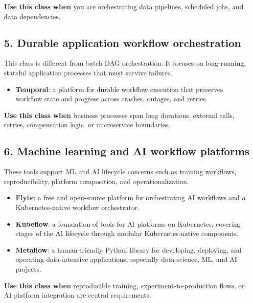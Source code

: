 \documentclass[11pt]{article}
\begin{document}
\textbf{Use this class when} you are orchestrating data pipelines, scheduled jobs, and data dependencies.

\subsection{5. Durable application workflow orchestration}
This class is different from batch DAG orchestration. It focuses on long-running, stateful application processes that must survive failures.
\begin{itemize}
    \item \textbf{Temporal}: a platform for durable workflow execution that preserves workflow state and progress across crashes, outages, and retries.\cite{TemporalWhatIs,TemporalWorkflowExecution}
\end{itemize}

\textbf{Use this class when} business processes span long durations, external calls, retries, compensation logic, or microservice boundaries.

\subsection{6. Machine learning and AI workflow platforms}
These tools support ML and AI lifecycle concerns such as training workflows, reproducibility, platform composition, and operationalization.
\begin{itemize}
    \item \textbf{Flyte}: a free and open-source platform for orchestrating AI workflows and a Kubernetes-native workflow orchestrator.\cite{FlyteOSS}
    \item \textbf{Kubeflow}: a foundation of tools for AI platforms on Kubernetes, covering stages of the AI lifecycle through modular Kubernetes-native components.\cite{KubeflowIntro,KubeflowPipelines}
    \item \textbf{Metaflow}: a human-friendly Python library for developing, deploying, and operating data-intensive applications, especially data science, ML, and AI projects.\cite{MetaflowWhatIs,MetaflowWhy}
\end{itemize}

\textbf{Use this class when} reproducible training, experiment-to-production flows, or AI-platform integration are central requirements.
\end{document}
